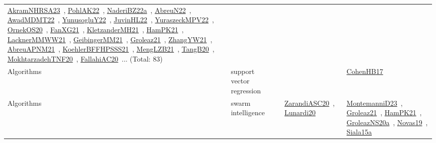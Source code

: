 {\begin{longtable}{lp{3cm}>{\raggedright\arraybackslash}p{6cm}>{\raggedright\arraybackslash}p{6cm}>{\raggedright\arraybackslash}p{8cm}}
\href{../works/AkramNHRSA23.pdf}{AkramNHRSA23}~\cite{AkramNHRSA23}, \href{../works/PohlAK22.pdf}{PohlAK22}~\cite{PohlAK22}, \href{../works/NaderiBZ22a.pdf}{NaderiBZ22a}~\cite{NaderiBZ22a}, \href{../works/AbreuN22.pdf}{AbreuN22}~\cite{AbreuN22}, \href{../works/AwadMDMT22.pdf}{AwadMDMT22}~\cite{AwadMDMT22}, \href{../works/YunusogluY22.pdf}{YunusogluY22}~\cite{YunusogluY22}, \href{../works/JuvinHL22.pdf}{JuvinHL22}~\cite{JuvinHL22}, \href{../works/YuraszeckMPV22.pdf}{YuraszeckMPV22}~\cite{YuraszeckMPV22}, \href{../works/OrnekOS20.pdf}{OrnekOS20}~\cite{OrnekOS20}, \href{../works/FanXG21.pdf}{FanXG21}~\cite{FanXG21}, \href{../works/KletzanderMH21.pdf}{KletzanderMH21}~\cite{KletzanderMH21}, \href{../works/HamPK21.pdf}{HamPK21}~\cite{HamPK21}, \href{../works/LacknerMMWW21.pdf}{LacknerMMWW21}~\cite{LacknerMMWW21}, \href{../works/GeibingerMM21.pdf}{GeibingerMM21}~\cite{GeibingerMM21}, \href{../works/Groleaz21.pdf}{Groleaz21}~\cite{Groleaz21}, \href{../works/ZhangYW21.pdf}{ZhangYW21}~\cite{ZhangYW21}, \href{../works/AbreuAPNM21.pdf}{AbreuAPNM21}~\cite{AbreuAPNM21}, \href{../works/KoehlerBFFHPSSS21.pdf}{KoehlerBFFHPSSS21}~\cite{KoehlerBFFHPSSS21}, \href{../works/MengLZB21.pdf}{MengLZB21}~\cite{MengLZB21}, \href{../works/TangB20.pdf}{TangB20}~\cite{TangB20}, \href{../works/MokhtarzadehTNF20.pdf}{MokhtarzadehTNF20}~\cite{MokhtarzadehTNF20}, \href{../works/FallahiAC20.pdf}{FallahiAC20}~\cite{FallahiAC20}... (Total: 83)\\
Algorithms & support vector regression &  &  & \href{../works/CohenHB17.pdf}{CohenHB17}~\cite{CohenHB17}\\
Algorithms & swarm intelligence &  & \href{../works/ZarandiASC20.pdf}{ZarandiASC20}~\cite{ZarandiASC20}, \href{../works/Lunardi20.pdf}{Lunardi20}~\cite{Lunardi20} & \href{../works/MontemanniD23.pdf}{MontemanniD23}~\cite{MontemanniD23}, \href{../works/Groleaz21.pdf}{Groleaz21}~\cite{Groleaz21}, \href{../works/HamPK21.pdf}{HamPK21}~\cite{HamPK21}, \href{../works/GroleazNS20a.pdf}{GroleazNS20a}~\cite{GroleazNS20a}, \href{../works/Novas19.pdf}{Novas19}~\cite{Novas19}, \href{../works/Siala15a.pdf}{Siala15a}~\cite{Siala15a}\\

\end{longtable}}
